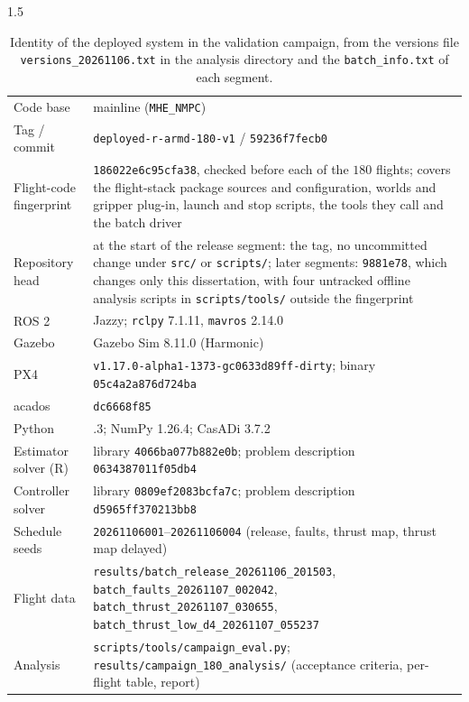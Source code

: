 \begin{appendices}
\begin{spacing}{1.5}
\begin{table}[ht]
\centering
\caption[Identity of the deployed system in the validation campaign]{Identity
of the deployed system in the validation campaign, from the versions file
\texttt{versions\_20261106.txt} in the analysis directory and the
\texttt{batch\_info.txt} of each segment.}
\label{tab:deployed-id}
\small
\begin{tabularx}{\textwidth}{@{}p{} >{\raggedright\arraybackslash}X@{}}
\toprule
Code base & mainline (\texttt{MHE\_NMPC}) \\
Tag / commit & \texttt{deployed-r-armd-180-v1} / \texttt{59236f7fecb0} \\
Flight-code fingerprint & \texttt{186022e6c95cfa38}, checked before each of the $180$ flights; covers the flight-stack package sources and configuration, worlds and gripper plug-in, launch and stop scripts, the tools they call and the batch driver \\
Repository head & at the start of the release segment: the tag, no uncommitted change under \texttt{src/} or \texttt{scripts/}; later segments: \texttt{9881e78}, which changes only this dissertation, with four untracked offline analysis scripts in \texttt{scripts/tools/} outside the fingerprint \\
ROS 2 & Jazzy; \texttt{rclpy} 7.1.11, \texttt{mavros} 2.14.0 \\
Gazebo & Gazebo Sim 8.11.0 (Harmonic) \\
PX4 & \texttt{v1.17.0-alpha1-1373-gc0633d89ff-dirty}; binary \texttt{05c4a2a876d724ba} \\
acados & \texttt{dc6668f85} \\
Python & 3.12.3; NumPy 1.26.4; CasADi 3.7.2 \\
Estimator solver (R) & library \texttt{4066ba077b882e0b}; problem description \texttt{0634387011f05db4} \\
Controller solver & library \texttt{0809ef2083bcfa7c}; problem description \texttt{d5965ff370213bb8} \\
Schedule seeds & \texttt{20261106001}--\texttt{20261106004} (release, faults, thrust map, thrust map delayed) \\
Flight data & \texttt{results/batch\_release\_20261106\_201503}, \texttt{batch\_faults\_20261107\_002042}, \texttt{batch\_thrust\_20261107\_030655}, \texttt{batch\_thrust\_low\_d4\_20261107\_055237} \\
Analysis & \texttt{scripts/tools/campaign\_eval.py}; \texttt{results/campaign\_180\_analysis/} (acceptance criteria, per-flight table, report) \\
\bottomrule
\end{tabularx}
\end{table}
\end{spacing}


\end{appendices}
